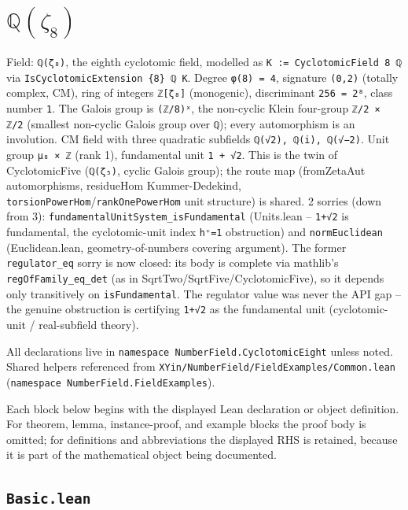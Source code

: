 \documentclass[UTF8,a4paper,11pt,fontset=fandol]{ctexart}
\theoremstyle{definition}
\begin{document}
\section{\(\mathbb Q(\zeta_8)\)}

Field: \texttt{ℚ(ζ₈)}, the eighth cyclotomic field, modelled as \texttt{K := CyclotomicField 8 ℚ} via \texttt{IsCyclotomicExtension \{8\} ℚ K}. Degree \texttt{φ(8) = 4}, signature \texttt{(0,2)} (totally complex, CM), ring of integers \texttt{ℤ[ζ₈]} (monogenic), discriminant \texttt{256 = 2⁸}, class number \texttt{1}. The Galois group is \texttt{(ℤ/\allowbreak{}8)ˣ}, the non-cyclic Klein four-group \texttt{ℤ/\allowbreak{}2 × ℤ/\allowbreak{}2} (smallest non-cyclic Galois group over \texttt{ℚ}); every automorphism is an involution. CM field with three quadratic subfields \texttt{ℚ(√2), ℚ(i), ℚ(√−2)}. Unit group \texttt{μ₈ × ℤ} (rank 1), fundamental unit \texttt{1 + √2}. This is the twin of CyclotomicFive (\texttt{ℚ(ζ₅)}, cyclic Galois group); the route map (fromZetaAut automorphisms, residueHom Kummer-Dedekind, \texttt{torsionPowerHom}/\texttt{rankOnePowerHom} unit structure) is shared. 2 sorries (down from 3): \texttt{fundamentalUnitSystem\_\allowbreak{}isFundamental} (Units.lean -- \texttt{1+√2} is fundamental, the cyclotomic-unit index \texttt{h⁺=1} obstruction) and \texttt{normEuclidean} (Euclidean.lean, geometry-of-numbers covering argument). The former \texttt{regulator\_\allowbreak{}eq} sorry is now closed: its body is complete via mathlib's \texttt{regOfFamily\_\allowbreak{}eq\_\allowbreak{}det} (as in SqrtTwo/SqrtFive/CyclotomicFive), so it depends only transitively on \texttt{isFundamental}. The regulator value was never the API gap -- the genuine obstruction is certifying \texttt{1+√2} as the fundamental unit (cyclotomic-unit / real-subfield theory).

All declarations live in \texttt{namespace NumberField.\allowbreak{}CyclotomicEight} unless noted. Shared helpers referenced from \texttt{XYin/\allowbreak{}NumberField/\allowbreak{}FieldExamples/\allowbreak{}Common.\allowbreak{}lean} (\texttt{namespace NumberField.\allowbreak{}FieldExamples}).

Each block below begins with the displayed Lean declaration or object definition. For theorem, lemma, instance-proof, and example blocks the proof body is omitted; for definitions and abbreviations the displayed RHS is retained, because it is part of the mathematical object being documented.

\subsection{\texttt{Basic.lean}}
\end{document}
